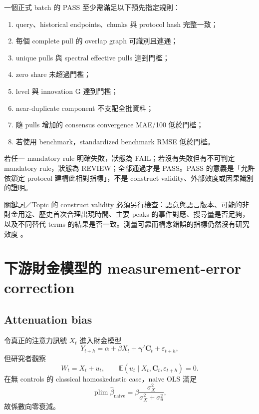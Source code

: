 \documentclass[12pt,a4paper,oneside]{article}
\newcommand{\E}{\mathbb{E}}
\newcommand{\plim}{\operatorname*{plim}}
\begin{document}
一個正式 batch 的 PASS 至少需滿足以下預先指定規則：
\begin{enumerate}
  \item query、historical endpoints、chunks 與 protocol hash 完整一致；
  \item 每個 complete pull 的 overlap graph 可識別且連通；
  \item unique pulls 與 spectral effective pulls 達到門檻；
  \item zero share 未超過門檻；
  \item level 與 innovation G 達到門檻；
  \item near-duplicate component 不支配全批資料；
  \item 隨 pulls 增加的 consensus convergence MAE/100 低於門檻；
  \item 若使用 benchmark，standardized benchmark RMSE 低於門檻。
\end{enumerate}

若任一 mandatory rule 明確失敗，狀態為 FAIL；若沒有失敗但有不可判定 mandatory rule，狀態為 REVIEW；全部通過才是 PASS。PASS 的意義是「允許依鎖定 protocol 建構此相對指標」，不是 construct validity、外部效度或因果識別的證明。

關鍵詞／Topic 的 construct validity 必須另行檢查：語意與語言版本、可能的非財金用途、歷史首次合理出現時間、主要 peaks 的事件對應、搜尋量是否足夠，以及不同替代 terms 的結果是否一致。測量可靠而構念錯誤的指標仍然沒有研究效度 \cite{holzl2025}。

\section{下游財金模型的 measurement-error correction}

\subsection{Attenuation bias}

令真正的注意力訊號 $X_t$ 進入財金模型
\begin{equation}
Y_{t+h}=\alpha+\beta X_t+\bm\gamma'\bm C_t+\varepsilon_{t+h},
\label{eq:downstreamtrue}
\end{equation}
但研究者觀察
\begin{equation}
W_t=X_t+u_t,
\qquad \E(u_t\mid X_t,\bm C_t,\varepsilon_{t+h})=0.
\end{equation}
在無 controls 的 classical homoskedastic case，naive OLS 滿足
\begin{equation}
\plim\widehat\beta_{\mathrm{naive}}
=\beta\frac{\sigma_X^2}{\sigma_X^2+\sigma_u^2},
\label{eq:attenuation}
\end{equation}
故係數向零衰減。
\end{document}
